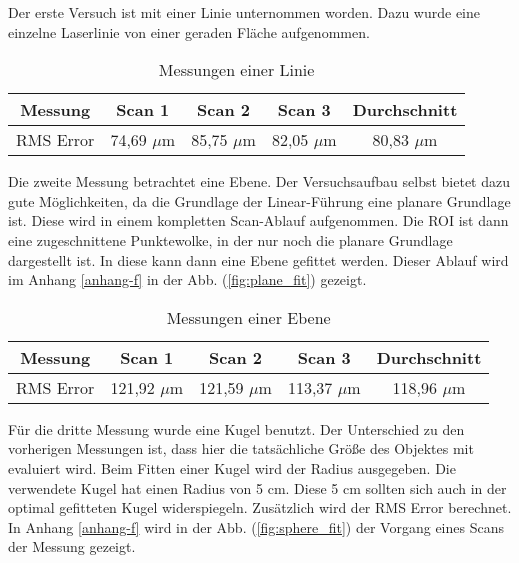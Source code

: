 		Der erste Versuch ist mit einer Linie unternommen worden. Dazu wurde eine einzelne Laserlinie von einer geraden Fläche aufgenommen.  
		
		\begin{table}[h]
			\centering
			
			\begin{tabular}[h]{c|c|c|c||c}
				Messung & Scan 1 & Scan 2 & Scan 3 & Durchschnitt \\
				\hline
				RMS Error & 74,69 $\mu$m & 85,75 $\mu$m & 82,05 $\mu$m & 80,83 $\mu$m \\
				\hline
			\end{tabular}
		
			\caption{Messungen einer Linie}
			\label{tab:linie}
			
		\end{table}
	
		Die zweite Messung betrachtet eine Ebene. Der Versuchsaufbau selbst bietet dazu gute Möglichkeiten, da die Grundlage der Linear-Führung eine planare Grundlage ist. Diese wird in einem kompletten Scan-Ablauf aufgenommen. Die ROI ist dann eine zugeschnittene Punktewolke, in der nur noch die planare Grundlage dargestellt ist. In diese kann dann eine Ebene gefittet werden. Dieser Ablauf wird im Anhang \ref{anhang-f} in der Abb. (\ref{fig:plane_fit}) gezeigt.
		
		\begin{table}[h]
			\centering
			
			\begin{tabular}[h]{c|c|c|c||c}
				Messung & Scan 1 & Scan 2 & Scan 3 & Durchschnitt \\
				\hline
				RMS Error & 121,92 $\mu$m & 121,59 $\mu$m & 113,37 $\mu$m & 118,96 $\mu$m \\
				\hline
			\end{tabular}
		
			\caption{Messungen einer Ebene}
			\label{tab:ebene}
			
		\end{table}
	
		Für die dritte Messung wurde eine Kugel benutzt. Der Unterschied zu den vorherigen Messungen ist, dass hier die tatsächliche Größe des Objektes mit evaluiert wird. Beim Fitten einer Kugel wird der Radius ausgegeben. Die verwendete Kugel hat einen Radius von 5 cm. Diese 5 cm sollten sich auch in der optimal gefitteten Kugel widerspiegeln. Zusätzlich wird der RMS Error berechnet. In Anhang \ref{anhang-f} wird in der Abb. (\ref{fig:sphere_fit}) der Vorgang eines Scans der Messung gezeigt.
	
